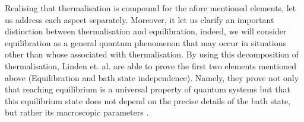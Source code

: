 
\indent Realising that thermalisation is compound for the afore mentioned elements, let us address each aspect separately. Moreover, it let us clarify an important distinction between thermalisation and equilibration, indeed, we will consider equilibration as a general quantum phenomenon that may occur in situations other than whose associated with thermalisation. By using this decomposition of thermalisation, Linden et. al. are able to prove the first two elements mentioned above (Equilibration and bath state independence). Namely, they prove not only that reaching equilibrium is a universal property of quantum systems but that this equilibrium state does not depend on the precise details of the bath state, but rather its macroscopic parameters \cite{linden_quantum_2009}.\\




